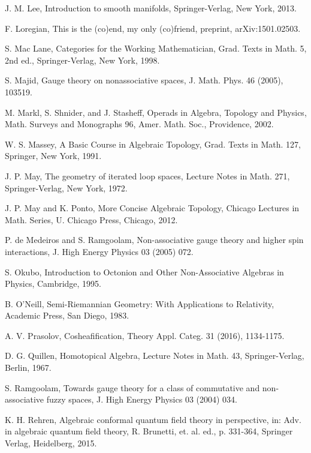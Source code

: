\documentclass[11pt]{amsbook}
\numberwithin{section}{chapter}
\numberwithin{subsection}{section}
\numberwithin{equation}{section}
\theoremstyle{plain}
\theoremstyle{definition}
\begin{document}
\begin{thebibliography}{AAAAAA}
J. M. Lee, Introduction to smooth manifolds, Springer-Verlag, New York, 2013.

F. Loregian, This is the (co)end, my only (co)friend, preprint, arXiv:1501.02503.

S. Mac Lane, Categories for the Working Mathematician, Grad. Texts in Math. 5, 2nd ed., Springer-Verlag, New York, 1998.

S. Majid, Gauge theory on nonassociative spaces, J. Math. Phys. 46 (2005), 103519.

M. Markl, S. Shnider, and J. Stasheff, Operads in Algebra, Topology and Physics, Math. Surveys and Monographs 96, Amer. Math. Soc., Providence, 2002.

W. S. Massey, A Basic Course in Algebraic Topology, Grad. Texts in Math. 127, Springer, New York, 1991.

J. P. May, The geometry of iterated loop spaces, Lecture Notes in Math. 271,
Springer-Verlag, New York, 1972.

J. P. May and K. Ponto, More Concise Algebraic Topology, Chicago Lectures in Math. Series, U. Chicago Press, Chicago, 2012.

P. de Medeiros and S. Ramgoolam, Non-associative gauge theory and higher spin interactions, J. High Energy Physics 03 (2005) 072.

S. Okubo, Introduction to Octonion and Other Non-Associative Algebras in Physics, Cambridge, 1995.

B. O'Neill, Semi-Riemannian Geometry: With Applications to Relativity, Academic Press, San Diego, 1983.

A. V. Prasolov, Cosheafification, Theory Appl. Categ. 31 (2016), 1134-1175.

D. G. Quillen, Homotopical Algebra, Lecture Notes in Math. 43, Springer-Verlag, Berlin, 1967.

S. Ramgoolam, Towards gauge theory for a class of commutative and non-associative fuzzy spaces, J. High Energy Physics 03 (2004) 034.

K. H. Rehren, Algebraic conformal quantum field theory in perspective, in: Adv. in algebraic quantum field theory, R. Brunetti, et. al. ed., p. 331-364, Springer Verlag, Heidelberg, 2015. 


\end{thebibliography}
\end{document}

